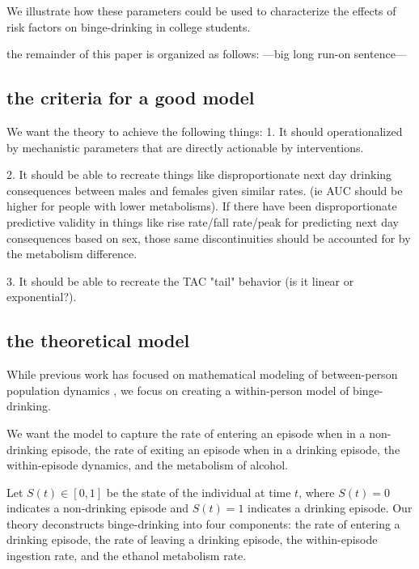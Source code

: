 We illustrate how these parameters could be used to characterize the effects of risk factors 
on binge-drinking in college students.

the remainder of this paper is organized as follows: ---big long run-on sentence---

\subsection{the criteria for a good model}
We want the theory to achieve the following things:
1. It should operationalized by mechanistic parameters that are directly actionable 
by interventions.

2. It should be able to recreate things like disproportionate next day drinking 
consequences between males and females given similar rates. (ie AUC should be higher
for people with lower metabolisms). If there have been disproportionate predictive validity
in things like rise rate/fall rate/peak for predicting next day consequences based on sex,
those same discontinuities should be accounted for by the metabolism difference.

3. It should be able to recreate the TAC "tail" behavior (is it linear or exponential?).




 

\subsection{the theoretical model}

While previous work has focused on mathematical modeling of between-person population
dynamics \parencite{gruenewald1994,duffy1992}, we focus on creating a within-person
model of binge-drinking.

We want the model to capture the rate of entering an episode when in a 
non-drinking episode, the rate of exiting an episode when in a drinking episode, 
the within-episode dynamics, and the metabolism of alcohol.

Let $S(t) \in [0, 1]$ be the state of the individual at time $t$, where $S(t) = 0$ 
indicates a non-drinking episode and $S(t) = 1$ indicates a drinking episode. Our theory
deconstructs binge-drinking into four components: the rate of entering a drinking
episode, the rate of leaving a drinking episode, the within-episode ingestion rate,
and the ethanol metabolism rate.

